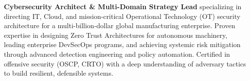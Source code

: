 \textbf{Cybersecurity Architect \& Multi-Domain Strategy Lead} specializing in directing IT, Cloud, and mission-critical Operational Technology (OT) security architecture for a multi-billion-dollar global manufacturing enterprise. Proven expertise in designing Zero Trust Architectures for autonomous machinery, leading enterprise DevSecOps programs, and achieving systemic risk mitigation through advanced detection engineering and policy automation. Certified in offensive security (OSCP, CRTO) with a deep understanding of adversary tactics to build resilient, defensible systems.
